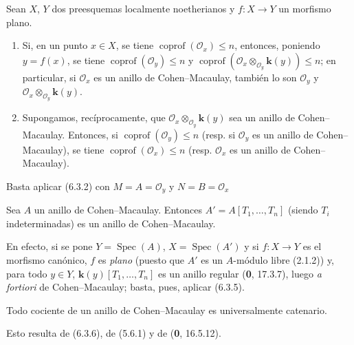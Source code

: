\begin{corollary}[6.3.5]
\label{IV.2.s6.3.5-fr}
Sean $X$, $Y$ dos preesquemas localmente noetherianos y $f:X\to Y$ un
morfismo plano.
\begin{enumerate}
\item[\textup{(i)}] Si, en un punto $x\in X$, se tiene
$\operatorname{coprof}(\mathcal O_x)\leq n$, entonces, poniendo $y=f(x)$, se
tiene $\operatorname{coprof}(\mathcal O_y)\leq n$ y
$\operatorname{coprof}(\mathcal O_x\otimes_{\mathcal O_y}\boldsymbol{k}(y))\leq n$; en
particular, si $\mathcal O_x$ es un anillo de Cohen--Macaulay, también lo son
$\mathcal O_y$ y $\mathcal O_x\otimes_{\mathcal O_y}\boldsymbol{k}(y)$.
\item[\textup{(ii)}] Supongamos, recíprocamente, que
$\mathcal O_x\otimes_{\mathcal O_y}\boldsymbol{k}(y)$ sea un anillo de Cohen--Macaulay.
Entonces, si $\operatorname{coprof}(\mathcal O_y)\leq n$ \textup{(resp.} si
$\mathcal O_y$ es un anillo de Cohen--Macaulay), se tiene
$\operatorname{coprof}(\mathcal O_x)\leq n$ \textup{(resp.} $\mathcal O_x$ es un
anillo de Cohen--Macaulay).
\end{enumerate}
\end{corollary}

Basta aplicar (6.3.2) con $M=A=\mathcal O_y$ y $N=B=\mathcal O_x$

\begin{corollary}[6.3.6]
\label{IV.2.s6.3.6-fr}
Sea $A$ un anillo de Cohen--Macaulay. Entonces
$A'=A[T_1,\ldots,T_n]$ (siendo $T_i$ indeterminadas) es un anillo de
Cohen--Macaulay.
\end{corollary}

En efecto, si se pone $Y=\operatorname{Spec}(A)$,
$X=\operatorname{Spec}(A')$ y si $f:X\to Y$ es el morfismo canónico, $f$ es
\emph{plano} (puesto que $A'$ es un $A$-módulo libre (2.1.2)) y, para todo $y\in Y$,
$\boldsymbol{k}(y)[T_1,\ldots,T_n]$ es un anillo regular (\textbf 0, 17.3.7), luego \emph{a
fortiori} de Cohen--Macaulay; basta, pues, aplicar (6.3.5).

\begin{corollary}[6.3.7]
\label{IV.2.s6.3.7-fr}
Todo cociente de un anillo de Cohen--Macaulay es universalmente catenario.
\end{corollary}

Esto resulta de (6.3.6), de (5.6.1) y de (\textbf 0, 16.5.12).
